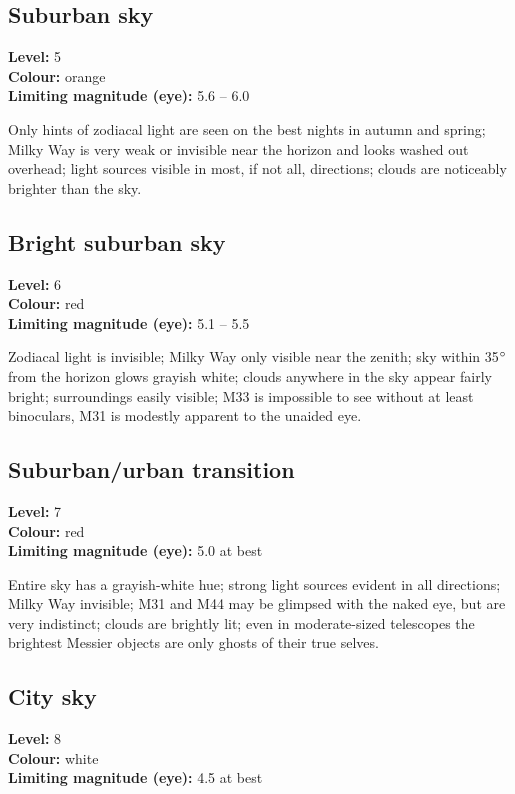 \subsection{Suburban sky}
\textbf{Level:} 5 \\
\textbf{Colour:} orange \\
\textbf{Limiting magnitude (eye):} 5.6 -- 6.0

Only hints of zodiacal light are seen on the best nights in autumn and spring; Milky Way is very weak or invisible near the horizon and looks washed out overhead; light sources visible in most, if not all, directions; clouds are noticeably brighter than the sky.

\subsection{Bright suburban sky}
\textbf{Level:} 6 \\
\textbf{Colour:} red \\
\textbf{Limiting magnitude (eye):} 5.1 -- 5.5

Zodiacal light is invisible; Milky Way only visible near the zenith; sky within 35$\degree$ from the horizon glows grayish white; clouds anywhere in the sky appear fairly bright; surroundings easily visible; M33 is impossible to see
without at least binoculars, M31 is modestly apparent to the unaided eye.

\subsection{Suburban/urban transition}
\textbf{Level:} 7 \\
\textbf{Colour:} red \\
\textbf{Limiting magnitude (eye):} 5.0 at best

Entire sky has a grayish-white hue; strong light sources evident in all directions; Milky Way invisible; M31 and M44 may be glimpsed with the naked eye, but are very indistinct; clouds are brightly lit; even in moderate-sized telescopes the brightest Messier objects are only ghosts of their true selves.

\subsection{City sky}
\textbf{Level:} 8 \\
\textbf{Colour:} white \\
\textbf{Limiting magnitude (eye):} 4.5 at best

